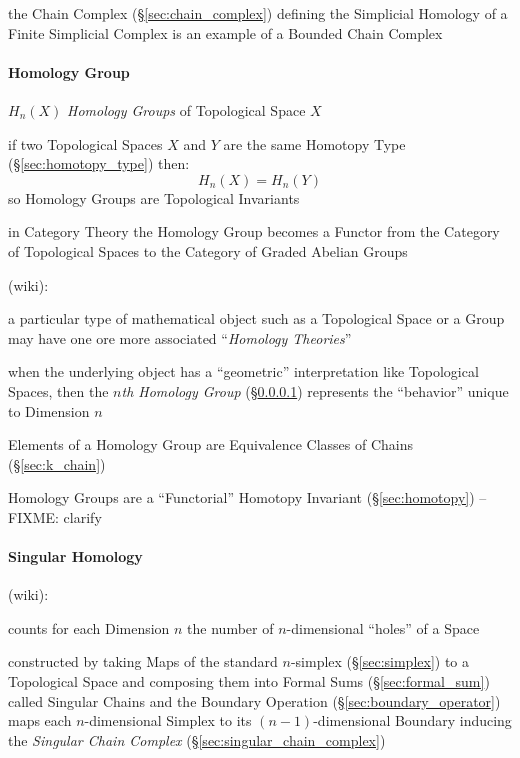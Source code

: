 the Chain Complex (\S\ref{sec:chain_complex}) defining the Simplicial Homology
of a Finite Simplicial Complex is an example of a Bounded Chain Complex



\paragraph{Homology Group}\label{sec:homology_group}\hfill

$H_n(X)$ \emph{Homology Groups} of Topological Space $X$

if two Topological Spaces $X$ and $Y$ are the same Homotopy Type
(\S\ref{sec:homotopy_type}) then:
\[
  H_n(X) = H_n(Y)
\]
so Homology Groups are Topological Invariants

in Category Theory the Homology Group becomes a Functor from the Category of
Topological Spaces to the Category of Graded Abelian Groups

(wiki):

a particular type of mathematical object such as a Topological Space or a
Group may have one ore more associated ``\emph{Homology Theories}''

when the underlying object has a ``geometric'' interpretation like Topological
Spaces, then the \emph{$n$th Homology Group} (\S\ref{sec:homology_group})
represents the ``behavior'' unique to Dimension $n$

Elements of a Homology Group are Equivalence
Classes of Chains (\S\ref{sec:k_chain})

Homology Groups are a ``Functorial'' Homotopy Invariant (\S\ref{sec:homotopy})
--FIXME: clarify



\paragraph{Singular Homology}\label{sec:singular_homology}\hfill

(wiki):

counts for each Dimension $n$ the number of $n$-dimensional ``holes'' of a
Space

constructed by taking Maps of the standard $n$-simplex (\S\ref{sec:simplex}) to
a Topological Space and composing them into Formal Sums
(\S\ref{sec:formal_sum}) called Singular Chains and the Boundary Operation
(\S\ref{sec:boundary_operator}) maps each $n$-dimensional Simplex to its
$(n-1)$-dimensional Boundary inducing the \emph{Singular Chain Complex}
(\S\ref{sec:singular_chain_complex})

